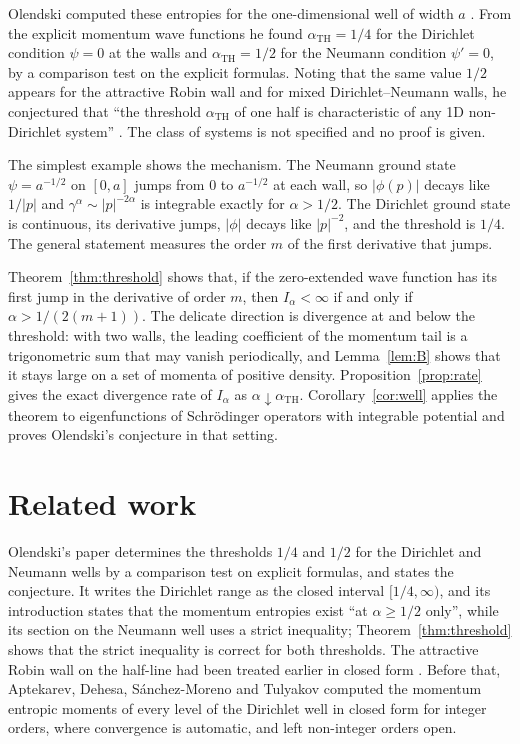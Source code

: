\documentclass[11pt,a4paper]{article}
\theoremstyle{definition}
\theoremstyle{plain}
\newcommand{\aTH}{\alpha_{\mathrm{TH}}}
\begin{document}
Olendski computed these entropies for the one-dimensional well of width $a$
\cite{Olendski2020}. From the explicit momentum wave functions he found
$\aTH=1/4$ for the Dirichlet condition $\psi=0$ at the walls and $\aTH=1/2$
for the Neumann condition $\psi'=0$, by a comparison test on the explicit
formulas. Noting that the same value $1/2$ appears
for the attractive Robin wall and for mixed Dirichlet--Neumann walls, he
conjectured that ``the threshold $\aTH$ of one half is characteristic of any
1D non-Dirichlet system'' \cite{Olendski2020}. The class of systems is not
specified and no proof is given.

The simplest example shows the mechanism. The Neumann ground state
$\psi=a^{-1/2}$ on $[0,a]$ jumps from $0$ to $a^{-1/2}$ at each wall, so
$|\phi(p)|$ decays like $1/|p|$ and $\gamma^\alpha\sim|p|^{-2\alpha}$ is
integrable exactly for $\alpha>1/2$. The Dirichlet ground state is continuous,
its derivative jumps, $|\phi|$ decays like $|p|^{-2}$, and the threshold is
$1/4$. The general statement measures the order $m$ of the first derivative
that jumps.

Theorem~\ref{thm:threshold} shows that, if the zero-extended wave function has
its first jump in the derivative of order $m$, then $I_\alpha<\infty$ if and
only if $\alpha>1/(2(m+1))$. The delicate direction is divergence at and below
the threshold: with two walls, the leading coefficient of the momentum tail
is a trigonometric sum that may vanish periodically, and Lemma~\ref{lem:B}
shows that it stays large on a set of momenta of positive density.
Proposition~\ref{prop:rate} gives the exact divergence rate of $I_\alpha$ as
$\alpha\downarrow\aTH$. Corollary~\ref{cor:well} applies the theorem to
eigenfunctions of Schr\"odinger operators with integrable potential and
proves Olendski's conjecture in that setting.

\section{Related work}\label{sec:related}
Olendski's paper \cite{Olendski2020} determines the thresholds $1/4$ and $1/2$
for the Dirichlet and Neumann wells by a comparison test on explicit formulas,
and states the conjecture. It writes the Dirichlet range as the closed
interval $[1/4,\infty)$, and its introduction states that the momentum
entropies exist ``at $\alpha\geq1/2$ only'', while its section on the Neumann
well uses a strict inequality; Theorem~\ref{thm:threshold} shows that the
strict inequality is correct for both thresholds. The attractive Robin wall on
the half-line had been treated earlier in closed form \cite{Olendski2019}.
Before that, Aptekarev, Dehesa, S\'anchez-Moreno and Tulyakov
\cite{ADST2012} computed the momentum entropic moments of every level of the
Dirichlet well in closed form for integer orders, where convergence is
automatic, and left non-integer orders open.
\end{document}
